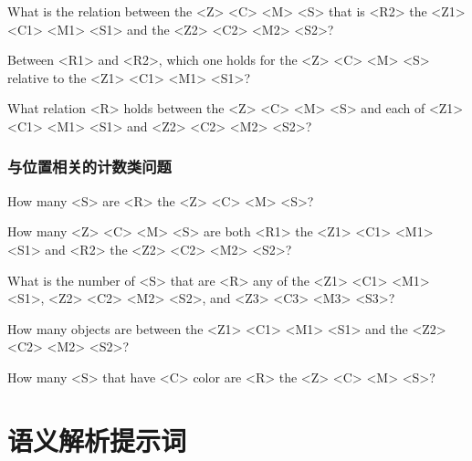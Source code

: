 What is the relation between the <Z> <C> <M> <S> that is <R2> the <Z1> <C1> <M1> <S1> and the <Z2> <C2> <M2> <S2>?

Between <R1> and <R2>, which one holds for the <Z> <C> <M> <S> relative to the <Z1> <C1> <M1> <S1>?

What relation <R> holds between the <Z> <C> <M> <S> and each of <Z1> <C1> <M1> <S1> and <Z2> <C2> <M2> <S2>?
\subsubsection{与位置相关的计数类问题}
How many <S> are <R> the <Z> <C> <M> <S>?

How many <Z> <C> <M> <S> are both <R1> the <Z1> <C1> <M1> <S1> and <R2> the <Z2> <C2> <M2> <S2>?

What is the number of <S> that are <R> any of the <Z1> <C1> <M1> <S1>, <Z2> <C2> <M2> <S2>, and <Z3> <C3> <M3> <S3>?

How many objects are between the <Z1> <C1> <M1> <S1> and the <Z2> <C2> <M2> <S2>?

How many <S> that have <C> color are <R> the <Z> <C> <M> <S>?
\section{语义解析提示词}
\label{appendix:semantics-parsing-prompts}



